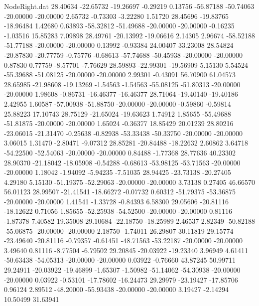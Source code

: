 \begin{filecontents}{NodeRight.dat}
  28.40634  -22.65732  -19.26697    -0.29219    0.13756  -56.87188  -50.74063  -20.00000  -20.00000    2.65732   -0.73303   -3.22280    1.51720
  28.45696  -19.83765  -18.96484     1.42680    0.63893  -58.32812  -51.49688  -20.00000  -20.00000   -0.16235   -1.03516   15.85283    7.09898
  28.49761  -20.13992  -19.06616     2.14305    2.96674  -58.52188  -51.77188  -20.00000  -20.00000    0.13992   -0.93384   24.00407   33.23008
  28.54824  -20.87830  -20.77759    -0.75776   -0.68613  -57.74688  -50.45938  -20.00000  -20.00000    0.87830    0.77759   -8.57701   -7.76629
  28.59893  -22.99301  -19.56909     5.15130    5.54524  -55.39688  -51.08125  -20.00000  -20.00000    2.99301   -0.43091   56.70900   61.04573
  28.65985  -21.98608  -19.13269    -1.54563   -1.54563  -55.08125  -51.80313  -20.00000  -20.00000    1.98608   -0.86731  -16.46377  -16.46377
  28.71064  -19.40140  -19.40186     2.42955    1.60587  -57.00938  -51.88750  -20.00000  -20.00000   -0.59860   -0.59814   25.88223   17.10743
  28.75129  -21.65024  -19.63623     1.74912    1.85655  -55.49688  -51.81875  -20.00000  -20.00000    1.65024   -0.36377   18.85429   20.01239
  28.80216  -23.06015  -21.31470    -0.25638   -0.82938  -53.33438  -50.33750  -20.00000  -20.00000    3.06015    1.31470   -2.80471   -9.07312
  28.85281  -20.84488  -18.22632     2.60862    3.64718  -54.22500  -52.54063  -20.00000  -20.00000    0.84488   -1.77368   28.77636   40.23302
  28.90370  -21.18042  -18.05908    -0.54288   -0.68613  -53.98125  -53.71563  -20.00000  -20.00000    1.18042   -1.94092   -5.94235   -7.51035
  28.94425  -23.73138  -20.27405     4.29180    5.15130  -51.19375  -52.29063  -20.00000  -20.00000    3.73138    0.27405   46.66570   56.01123
  28.99507  -21.41541  -18.66272    -0.07732    0.60312  -51.79375  -53.36875  -20.00000  -20.00000    1.41541   -1.33728   -0.84393    6.58300
  29.05606  -20.81116  -18.12622     0.71056    1.85655  -52.25938  -54.52500  -20.00000  -20.00000    0.81116   -1.87378    7.40582   19.35008
  29.10684  -22.18750  -18.25989     2.46537    2.82349  -50.82188  -55.06875  -20.00000  -20.00000    2.18750   -1.74011   26.29807   30.11819
  29.15774  -23.49640  -20.81116    -0.79357   -0.61451  -48.71563  -53.22187  -20.00000  -20.00000    3.49640    0.81116   -8.77504   -6.79502
  29.20845  -20.03922  -19.23340     3.96949    4.61411  -50.63438  -54.05313  -20.00000  -20.00000    0.03922   -0.76660   43.87245   50.99711
  29.24911  -20.03922  -19.46899    -1.65307   -1.50982  -51.14062  -54.30938  -20.00000  -20.00000    0.03922   -0.53101  -17.78602  -16.24473
  29.29979  -23.19427  -17.85706     0.96124    2.89512  -48.20000  -55.93438  -20.00000  -20.00000    3.19427   -2.14294   10.50499   31.63941

\end{filecontents}
